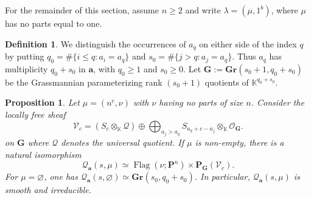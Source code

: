 \documentclass[leqno,11pt,a4paper]{amsart}
\newtheorem{prop}[prop]{Proposition}
\theoremstyle{definition}
\newtheorem{definition}[definition]{Definition}
\numberwithin{equation}{section}
\newcommand{\Gr}{\mathbf{Gr}}
\newcommand{\kk}{\mathbb{K}}
\newcommand{\bfa}{\mathbf{a}}
\newcommand{\PP}{\mathbf{P}}
\newcommand{\OO}{\mathscr{O}}
\newcommand{\QQ}{\mathcal{Q}}
\DeclareMathOperator{\Flag}{Flag}
\begin{document}
For the remainder of this section, assume $n\geq2$ and write $\lambda=(\mu,1^b)$, where $\mu$
has no parts equal to one.

\begin{definition}
We distinguish the occurrences of $a_q$ on either side of the index $q$ by putting $q_0=\#\{i\leq q:a_i=a_q\}$ and $s_0=\#\{j>q:a_j=a_q\}$.
Thus $a_q$ has multiplicity $q_0+s_0$ in $\bfa$, with $q_0\geq1$ and $s_0\geq0$. 
Let $\mathbf{G} :=\Gr(s_0+1,q_0+s_0)$ be the Grassmannian parameterizing rank $(s_0+1)$ quotients of $\kk^{q_0+s_0}$.
\end{definition}

\begin{prop}\label{core_isom}
Let $\mu=(n^c,\nu)$ with $\nu$ having no parts of size $n$. 
Consider the locally free sheaf
$$
\mathscr{V}_c=(S_c\otimes_\kk\mathscr{Q})\oplus \bigoplus_{a_j>a_q}S_{a_q+c-a_j}\otimes_\kk\OO_{\mathbf{G}}.
$$
on $\mathbf{G}$ where  $\mathscr{Q}$ denotes the universal quotient.
If $\mu$ is non-empty, there is a natural isomorphism
$$
\QQ_{\bfa}(s,\mu) \simeq \Flag(\nu;\PP^n)\times\PP_{\mathbf{G}}(\mathscr{V}_c).
$$
For $\mu=\varnothing$, one has $\QQ_{\bfa}(s,\varnothing)  \simeq \Gr(s_0,q_0+s_0)$.
In particular, $\QQ_{\bfa}(s,\mu) $ is smooth and irreducible.
\end{prop}
\end{document}
